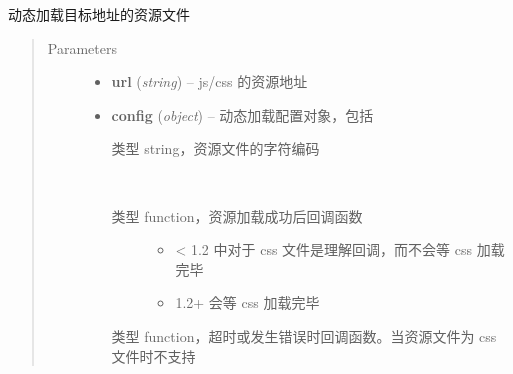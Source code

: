 \documentclass[letterpaper,10pt,english]{sphinxmanual}
\begin{document}
\begin{fulllineitems}
\label{api/seed/loader/getScript:Loader.KISSY.getScript}
动态加载目标地址的资源文件
\begin{quote}\begin{description}
\item[{Parameters}] \leavevmode\begin{itemize}
\item {}
\textbf{url} (\emph{string}) -- js/css 的资源地址

\item {}
\textbf{config} (\emph{object}) --
动态加载配置对象，包括


\begin{fulllineitems}
\label{api/seed/loader/getScript:Loader.config.charset}
类型 string，资源文件的字符编码

\end{fulllineitems}



\begin{fulllineitems}
\label{api/seed/loader/getScript:Loader.config.success}~\begin{description}
\item[{类型 function，资源加载成功后回调函数}] \leavevmode\begin{itemize}
\item {}
\textless{} 1.2 中对于 css 文件是理解回调，而不会等 css 加载完毕

\item {}
1.2+ 会等 css 加载完毕

\end{itemize}

\end{description}

\end{fulllineitems}



\begin{fulllineitems}
\label{api/seed/loader/getScript:Loader.config.error}
类型 function，超时或发生错误时回调函数。当资源文件为 css 文件时不支持


\end{fulllineitems}
\end{itemize}
\end{description}
\end{quote}
\end{fulllineitems}
\end{document}
